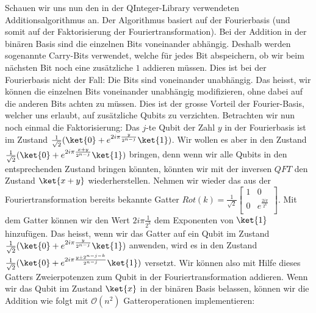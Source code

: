 Schauen wir uns nun den in der QInteger-Library verwendeten Additionsalgorithmus an. Der Algorithmus basiert auf der Fourierbasis (und somit auf der Faktorisierung der Fouriertransformation). Bei der Addition in der binären Basis sind die einzelnen Bits voneinander abhängig. Deshalb werden sogenannte Carry-Bits verwendet, welche für jedes Bit abspeichern, ob wir beim nächsten Bit noch eine zusätzliche $1$ addieren müssen. Dies ist bei der Fourierbasis nicht der Fall: Die Bits sind voneinander unabhängig. Das heisst, wir können die einzelnen Bits voneinander unabhängig modifizieren, ohne dabei auf die anderen Bits achten zu müssen. Dies ist der grosse Vorteil der Fourier-Basis, welcher uns erlaubt, auf zusätzliche Qubits zu verzichten. Betrachten wir nun noch einmal die Faktorisierung: Das $j$-te Qubit der Zahl $y$ in der Fourierbasis ist im Zustand $\frac{1}{\sqrt{2}}(\ket{0} + e^{2i\pi\frac{y}{2^{n - j}}}\ket{1})$. Wir wollen es aber in den Zustand $\frac{1}{\sqrt{2}}(\ket{0} + e^{2i\pi\frac{x + y}{2^{n - j}}}\ket{1})$ bringen, denn wenn wir alle Qubits in den entsprechenden Zustand bringen könnten, könnten wir mit der inversen $QFT$ den Zustand $\ket{x + y}$ wiederherstellen. Nehmen wir wieder das aus der Fouriertransformation bereits bekannte Gatter $Rot(k) = \frac{1}{\sqrt{2}}\begin{bmatrix}
    1 & 0 \\
    0 & e^{\frac{2i\pi}{2^k}} \\
\end{bmatrix}$. Mit dem Gatter können wir den Wert $2i\pi\frac{1}{2^k}$ dem Exponenten von $\ket{1}$ hinzufügen. Das heisst, wenn wir das Gatter auf ein Qubit im Zustand $\frac{1}{\sqrt{2}}(\ket{0} + e^{2i\pi\frac{y}{2^{n - j}}}\ket{1})$ anwenden, wird es in den Zustand $\frac{1}{\sqrt{2}}(\ket{0} + e^{2i\pi\frac{y + 2^{n - j - k}}{2^{n - j}}}\ket{1})$ versetzt. Wir können also mit Hilfe dieses Gatters Zweierpotenzen zum Qubit in der Fouriertransformation addieren. Wenn wir das Qubit im Zustand $\ket{x}$ in der binären Basis belassen, können wir die Addition wie folgt mit $\mathcal O(n^2)$ Gatteroperationen implementieren:
